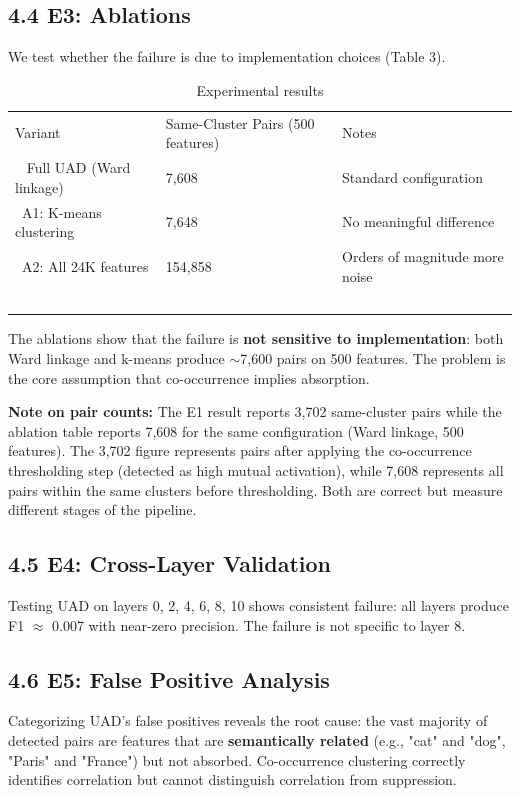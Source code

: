 \documentclass{article}
\begin{document}
\subsection{4.4 E3: Ablations}

We test whether the failure is due to implementation choices (Table 3).

\begin{table}[ht]
\centering
\small
\begin{tabular}{lll}
\toprule
Variant & Same-Cluster Pairs (500 features) & Notes \\\
\midrule
Full UAD (Ward linkage) & 7,608 & Standard configuration \\\
A1: K-means clustering & 7,648 & No meaningful difference \\\
A2: All 24K features & 154,858 & Orders of magnitude more noise \\\
\bottomrule
\end{tabular}
\caption{Experimental results}
\end{table}

The ablations show that the failure is \textbf{not sensitive to implementation}: both Ward linkage and k-means produce $\sim$7,600 pairs on 500 features. The problem is the core assumption that co-occurrence implies absorption.

\textbf{Note on pair counts:} The E1 result reports 3,702 same-cluster pairs while the ablation table reports 7,608 for the same configuration (Ward linkage, 500 features). The 3,702 figure represents pairs after applying the co-occurrence thresholding step (detected as high mutual activation), while 7,608 represents all pairs within the same clusters before thresholding. Both are correct but measure different stages of the pipeline.

\subsection{4.5 E4: Cross-Layer Validation}

Testing UAD on layers 0, 2, 4, 6, 8, 10 shows consistent failure: all layers produce F1 $\approx$ 0.007 with near-zero precision. The failure is not specific to layer 8.

\subsection{4.6 E5: False Positive Analysis}

Categorizing UAD's false positives reveals the root cause: the vast majority of detected pairs are features that are \textbf{semantically related} (e.g., "cat" and "dog", "Paris" and "France") but not absorbed. Co-occurrence clustering correctly identifies correlation but cannot distinguish correlation from suppression.
\end{document}

